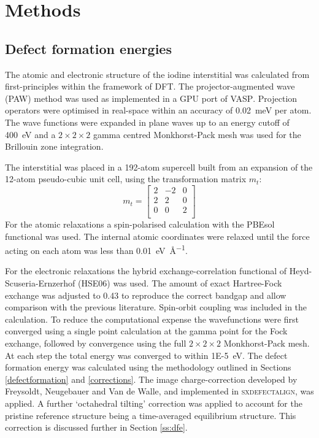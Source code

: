 \section{Methods}

\subsection{Defect formation energies} \label{method:dfe}

The atomic and electronic structure of the iodine interstitial was calculated from first-principles within the framework of DFT. The projector-augmented wave (PAW) method\autocite{Blochl1994} was used as implemented in a GPU port of \textsc{VASP}.\autocite{Kresse1996a} Projection operators were optimised in real-space within an accuracy of \SI{0.02}{\milli\electronvolt} per atom. The wave functions were expanded in plane waves up to an energy cutoff of \SI{400}{\electronvolt} and a $2\! \times\!2\!\times\! 2$ gamma centred Monkhorst-Pack mesh was used for the Brillouin zone integration.

The interstitial was placed in a 192-atom supercell built from an expansion of the 12-atom pseudo-cubic unit cell, using the transformation matrix $m_t$:
$$
m_t = \begin{bmatrix}
2 & -2 & 0 \\
2 & 2 & 0 \\
0 & 0 & 2 \\
\end{bmatrix}
$$
For the atomic relaxations a spin-polarised calculation with the PBEsol functional was used.\autocite{Perdew2008a} The internal atomic coordinates were relaxed until the force acting on each atom was less than \SI{0.01}{\electronvolt\per\angstrom}. 

For the electronic relaxations the hybrid exchange-correlation functional of Heyd-Scuseria-Ernzerhof (HSE06) was used.\autocite{Heyd2004a,Heyd2005a} The amount of exact Hartree-Fock exchange was adjusted to 0.43 to reproduce the correct bandgap and allow comparison with the previous literature.\autocite{Meggiolaro2018,Du2015} 
 Spin-orbit coupling was included in the calculation.
To reduce the computational expense the wavefunctions were first converged using a single point calculation at the gamma point for the Fock exchange, followed by convergence using the full $2\!\times\!2\!\times\!2$ Monkhorst-Pack mesh. At each step the total energy was converged to within \SI{1E-5}{\electronvolt}.
The defect formation energy was calculated using the methodology outlined in Sections \ref{defectformation} and \ref{corrections}. The image charge-correction developed by Freysoldt, Neugebauer and Van de Walle, and implemented in \textsc{sxdefectalign},\autocite{sxdefectalign} was applied. A further `octahedral tilting' correction was applied to account for the pristine reference structure being a time-averaged equilibrium structure. This correction is discussed further in Section \ref{ss:dfe}.

